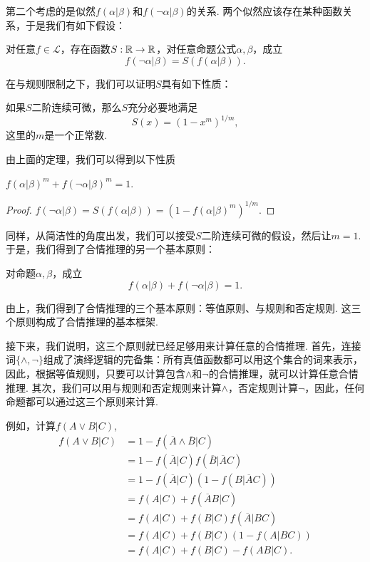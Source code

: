 第二个考虑的是似然$f(\alpha|\beta)$和$f(\neg\alpha|\beta)$的关系. 两个似然应该存在某种函数关系，于是我们有如下假设：

\begin{hypothesis}
    对任意$f\in\mathcal L$，存在函数$S:\mathbb{R}\to\mathbb{R}$，对任意命题公式$\alpha,\beta$，成立
    \[f(\neg\alpha|\beta)=S(f(\alpha|\beta)).\]
\end{hypothesis}

在与规则限制之下，我们可以证明$S$具有如下性质：
\begin{theorem}
    如果$S$二阶连续可微，那么$S$充分必要地满足
    \begin{equation*}
        S(x) = (1 - x^m)^{1/m},
    \end{equation*}
    这里的$m$是一个正常数.
\end{theorem}

由上面的定理，我们可以得到以下性质
\begin{corollary}
    $f(\alpha|\beta)^m + f(\neg\alpha|\beta)^m = 1$.
\end{corollary}
\begin{proof}
    $f(\neg\alpha|\beta) = S(f(\alpha|\beta)) = (1 - f(\alpha|\beta)^m)^{1/m}$.
\end{proof}

同样，从简洁性的角度出发，我们可以接受$S$二阶连续可微的假设，然后让$m=1$. 于是，我们得到了合情推理的另一个基本原则：
\begin{principle}[否定规则]
对命题$\alpha,\beta$，成立
\[f(\alpha|\beta) + f(\neg\alpha|\beta) = 1.\]
\end{principle}

由上，我们得到了合情推理的三个基本原则：等值原则、与规则和否定规则. 这三个原则构成了合情推理的基本框架.

接下来，我们说明，这三个原则就已经足够用来计算任意的合情推理. 首先，连接词$\{\wedge,\neg\}$组成了演绎逻辑的完备集：所有真值函数都可以用这个集合的词来表示，因此，根据等值规则，只要可以计算包含$\wedge$和$\neg$的合情推理，就可以计算任意合情推理. 其次，我们可以用与规则和否定规则来计算$\wedge$，否定规则计算$\neg$，因此，任何命题都可以通过这三个原则来计算.

\begin{example}
    例如，计算$f(A\vee B|C)$,
        \begin{align*}
            f(A \vee B|C) 
            &= 1 - f(\overline{A}\wedge\overline{B}|C)\\
            & = 1 - f(\overline{A}|C)f(\overline{B}|\overline{A}C) \\
            &= 1 - f(\overline{A}|C)(1 - f(B|\overline{A}C))\\
            &= f(A|C) + f(\overline{A}B|C) \\
            &= f(A|C) + f(B|C)f(\overline{A}|BC) \\
            &= f(A|C) + f(B|C)(1 - f(A|BC))\\
            &= f(A|C) + f(B|C) - f(AB|C).
        \end{align*}
\end{example}


